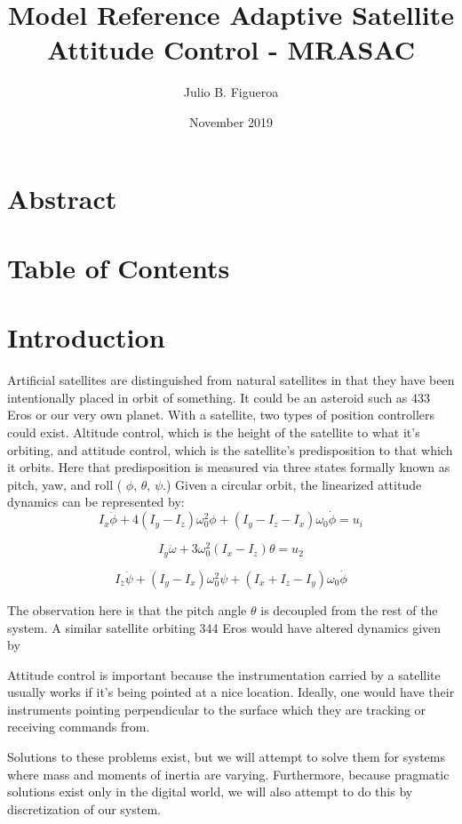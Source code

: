 \documentclass{article}
\title{Model Reference Adaptive Satellite Attitude Control - MRASAC}
\author{Julio
B. Figueroa}
\date{November 2019}
\begin{document}
\maketitle
\section{Abstract}
\section{Table of Contents}
\section{Introduction}
Artificial satellites are distinguished from natural satellites in that they have been intentionally placed in orbit of something.
It could be an asteroid such as 433 Eros or our very own planet.
With a satellite, two types of position controllers could exist.
Altitude control, which is the height of the satellite to what it's orbiting, and attitude control, which is the satellite's predisposition to that which it orbits.
Here that predisposition is measured via three states formally known as pitch, yaw, and roll (
$\phi$, $\theta$, $\psi$.) Given a circular orbit, the linearized attitude dynamics can be represented by:
\begin{equation}
I_{x} \ddot{\phi} +4(I_{y}-I_{z})\omega^{2}_{0}\phi+(I_{y}-I_{z}-I_{x})\omega_{0}\dot{\phi} = u_{i}
\end{equation}

\begin{equation}
I_{y}\ddot{\omega}+3\omega^{2}_{0}(I_{x}-I_{z})\theta = u_{2}
\end{equation}

\begin{equation}
I_{z}\ddot{\psi}+(I_{y}-I_{x})\omega^{2}_{0}\psi + (I_{x} + I_{z} - I_{y})\omega_{0}\dot{\phi}
\end{equation}

The observation here is that the pitch angle $\theta$ is decoupled from the rest of the system.
A similar satellite orbiting 344 Eros would have altered dynamics given by

Attitude control is important because the instrumentation carried by a satellite usually works if it's being pointed at a nice location. Ideally, one would have their instruments pointing perpendicular to the surface which they are tracking or receiving commands from.

Solutions to these problems exist, but we will attempt to solve them for systems where mass and moments of inertia are varying. Furthermore, because pragmatic solutions exist only in the digital world, we will also attempt to do this by discretization of our system.
\end{document}
